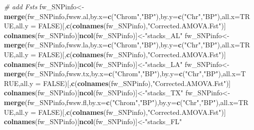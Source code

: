 \documentclass[]{article}
\newenvironment{Shaded}{\begin{snugshade}}{\end{snugshade}}
\newcommand{\KeywordTok}[1]{\textcolor[rgb]{0.13,0.29,0.53}{\textbf{#1}}}
\newcommand{\DataTypeTok}[1]{\textcolor[rgb]{0.13,0.29,0.53}{#1}}
\newcommand{\StringTok}[1]{\textcolor[rgb]{0.31,0.60,0.02}{#1}}
\newcommand{\CommentTok}[1]{\textcolor[rgb]{0.56,0.35,0.01}{\textit{#1}}}
\newcommand{\OtherTok}[1]{\textcolor[rgb]{0.56,0.35,0.01}{#1}}
\newcommand{\NormalTok}[1]{#1}
\begin{document}
\begin{Shaded}
\begin{Highlighting}[]
\CommentTok{# add Fsts}
\NormalTok{fw_SNPinfo<-}\KeywordTok{merge}\NormalTok{(fw_SNPinfo,fwsw.al,}\DataTypeTok{by.x=}\KeywordTok{c}\NormalTok{(}\StringTok{"Chrom"}\NormalTok{,}\StringTok{"BP"}\NormalTok{),}\DataTypeTok{by.y=}\KeywordTok{c}\NormalTok{(}\StringTok{"Chr"}\NormalTok{,}\StringTok{"BP"}\NormalTok{),}\DataTypeTok{all.x=}\OtherTok{TRUE}\NormalTok{,}\DataTypeTok{all.y =} \OtherTok{FALSE}\NormalTok{)[,}\KeywordTok{c}\NormalTok{(}\KeywordTok{colnames}\NormalTok{(fw_SNPinfo),}\StringTok{"Corrected.AMOVA.Fst"}\NormalTok{)] }
\KeywordTok{colnames}\NormalTok{(fw_SNPinfo)[}\KeywordTok{ncol}\NormalTok{(fw_SNPinfo)]<-}\StringTok{"stacks_AL"}
\NormalTok{fw_SNPinfo<-}\KeywordTok{merge}\NormalTok{(fw_SNPinfo,fwsw.la,}\DataTypeTok{by.x=}\KeywordTok{c}\NormalTok{(}\StringTok{"Chrom"}\NormalTok{,}\StringTok{"BP"}\NormalTok{),}\DataTypeTok{by.y=}\KeywordTok{c}\NormalTok{(}\StringTok{"Chr"}\NormalTok{,}\StringTok{"BP"}\NormalTok{),}\DataTypeTok{all.x=}\OtherTok{TRUE}\NormalTok{,}\DataTypeTok{all.y =} \OtherTok{FALSE}\NormalTok{)[,}\KeywordTok{c}\NormalTok{(}\KeywordTok{colnames}\NormalTok{(fw_SNPinfo),}\StringTok{"Corrected.AMOVA.Fst"}\NormalTok{)] }
\KeywordTok{colnames}\NormalTok{(fw_SNPinfo)[}\KeywordTok{ncol}\NormalTok{(fw_SNPinfo)]<-}\StringTok{"stacks_LA"}
\NormalTok{fw_SNPinfo<-}\KeywordTok{merge}\NormalTok{(fw_SNPinfo,fwsw.tx,}\DataTypeTok{by.x=}\KeywordTok{c}\NormalTok{(}\StringTok{"Chrom"}\NormalTok{,}\StringTok{"BP"}\NormalTok{),}\DataTypeTok{by.y=}\KeywordTok{c}\NormalTok{(}\StringTok{"Chr"}\NormalTok{,}\StringTok{"BP"}\NormalTok{),}\DataTypeTok{all.x=}\OtherTok{TRUE}\NormalTok{,}\DataTypeTok{all.y =} \OtherTok{FALSE}\NormalTok{)[,}\KeywordTok{c}\NormalTok{(}\KeywordTok{colnames}\NormalTok{(fw_SNPinfo),}\StringTok{"Corrected.AMOVA.Fst"}\NormalTok{)] }
\KeywordTok{colnames}\NormalTok{(fw_SNPinfo)[}\KeywordTok{ncol}\NormalTok{(fw_SNPinfo)]<-}\StringTok{"stacks_TX"}
\NormalTok{fw_SNPinfo<-}\KeywordTok{merge}\NormalTok{(fw_SNPinfo,fwsw.fl,}\DataTypeTok{by.x=}\KeywordTok{c}\NormalTok{(}\StringTok{"Chrom"}\NormalTok{,}\StringTok{"BP"}\NormalTok{),}\DataTypeTok{by.y=}\KeywordTok{c}\NormalTok{(}\StringTok{"Chr"}\NormalTok{,}\StringTok{"BP"}\NormalTok{),}\DataTypeTok{all.x=}\OtherTok{TRUE}\NormalTok{,}\DataTypeTok{all.y =} \OtherTok{FALSE}\NormalTok{)[,}\KeywordTok{c}\NormalTok{(}\KeywordTok{colnames}\NormalTok{(fw_SNPinfo),}\StringTok{"Corrected.AMOVA.Fst"}\NormalTok{)] }
\KeywordTok{colnames}\NormalTok{(fw_SNPinfo)[}\KeywordTok{ncol}\NormalTok{(fw_SNPinfo)]<-}\StringTok{"stacks_FL"}

\end{Highlighting}
\end{Shaded}
\end{document}

